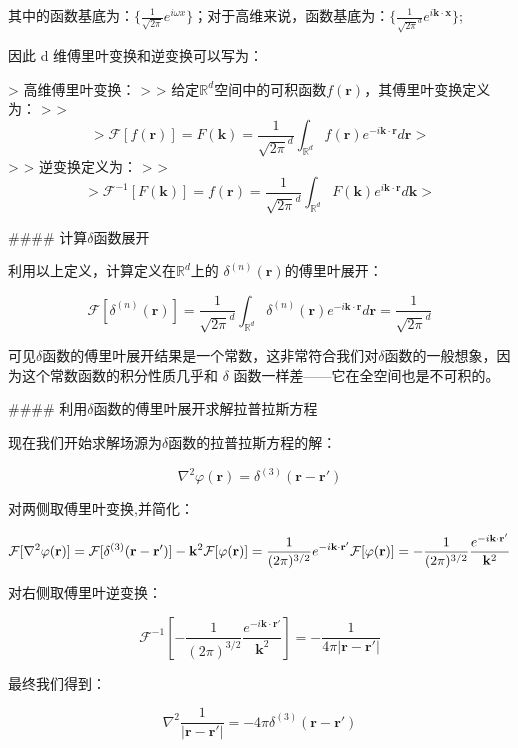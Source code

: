 \documentclass[lang=cn,10pt,newtx,bibend=biber,device=pad]{elegantbook}
\begin{document}
其中的函数基底为：$\{\frac{1}{\sqrt{2\pi}}e^{i\omega x}\}$；对于高维来说，函数基底为：$\{\frac{1}{\sqrt{2\pi}^{d}}e^{i\mathbf{k}\cdot\mathbf{x}}\}$;

因此 d 维傅里叶变换和逆变换可以写为：

> 高维傅里叶变换：
>
> 给定$\mathbb{R}^d$​空间中的可积函数$f(\mathbf{r})$，其傅里叶变换定义为：
>
> $$
> \mathcal{F}[f(\mathbf{r})] = F(\mathbf{k}) =\frac{1}{\sqrt{2\pi}^{d}} \int_{\mathbb{R}^d} f(\mathbf{r}) e^{-i \mathbf{k} \cdot \mathbf{r}} d\mathbf{r}
> $$
>
> 逆变换定义为：
>
> $$
> \mathcal{F}^{-1}[F(\mathbf{k})] = f(\mathbf{r}) =\frac{1}{\sqrt{2\pi}^{d}} \int_{\mathbb{R}^d} F(\mathbf{k}) e^{i \mathbf{k} \cdot \mathbf{r}} d\mathbf{k}
> $$

#### 计算$\delta$函数展开

利用以上定义，计算定义在$\mathbb{R}^d$上的 $\delta^{(n)}(\mathbf{r})$的傅里叶展开：

$$
\mathcal{F}[\delta^{(n)}(\mathbf{r})]  =\frac{1}{\sqrt{2\pi}^{d}} \int_{\mathbb{R}^d} \delta^{(n)}(\mathbf{r}) e^{-i \mathbf{k} \cdot \mathbf{r}} d\mathbf{r} = \frac{1}{\sqrt{2\pi}^{d}}
$$

可见$\delta$函数的傅里叶展开结果是一个常数，这非常符合我们对$\delta$函数的一般想象，因为这个常数函数的积分性质几乎和 $\delta$ 函数一样差——它在全空间也是不可积的。

#### 利用$\delta$函数的傅里叶展开求解拉普拉斯方程

现在我们开始求解场源为$\delta$函数的拉普拉斯方程的解：

$$
\nabla^2 \varphi(\mathbf{r}) = \delta^{(3)}(\mathbf{r}-\mathbf{r'})
$$

对两侧取傅里叶变换,并简化：

$$
\mathcal{F}[\nabla^2 \varphi(\mathbf{r})] = \mathcal{F}[\delta^{(3)}(\mathbf{r}-\mathbf{r'})]\\
-\mathbf{k}^2\mathcal{F}[\varphi(\mathbf{r})]=\frac{1}{(2\pi)^{3/2}}e^{-i\mathbf{k}\cdot\mathbf{r'}}\\
\mathcal{F}[\varphi(\mathbf{r})]=-\frac{1}{(2\pi)^{3/2}}\frac{e^{-i\mathbf{k}\cdot\mathbf{r'}}}{\mathbf{k}^2}
$$

对右侧取傅里叶逆变换：

$$
\mathcal{F}^{-1}[-\frac{1}{(2\pi)^{3/2}}\frac{e^{-i\mathbf{k}\cdot\mathbf{r'}}}{\mathbf{k}^2}] = -\frac{1}{4\pi|\mathbf{r}-\mathbf{r'}|}
$$

最终我们得到：

$$
\nabla^2 \frac{1}{|\mathbf{r}-\mathbf{r'}|} = -4\pi \delta^{(3)}(\mathbf{r}-\mathbf{r'})
$$
\end{document}
